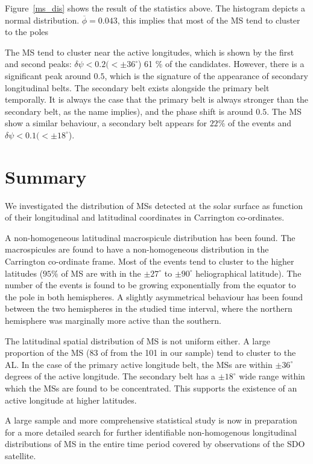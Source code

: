 Figure~\ref{ms_dis} shows the result of the statistics above. 
The histogram depicts a normal distribution. 
$\overline{\phi}=0.043$, this implies that most of the MS tend to cluster to the poles

The MS tend to cluster near the active longitudes, which is shown by the first and second peaks: $\delta\psi< 0.2 (<\pm 36^{\circ}$) 61 \% of the candidates.
However, there is a significant peak around $0.5$, which is the signature of the appearance of secondary longitudinal belts. 
The secondary belt exists alongside the primary belt temporally. 
It is always the case that the primary belt is always stronger than the secondary belt, as the name implies), and the phase shift is around $0.5$.
The MS show a similar behaviour, a secondary belt appears for $22\%$ of the events and $\delta\psi< 0.1 (<\pm 18^{\circ}$).

\section{Summary}
We investigated the distribution of MSs detected at the solar surface as function of their longitudinal and latitudinal coordinates in Carrington co-ordinates.

A non-homogeneous latitudinal macrospicule distribution has been found. 
The macrospicules are found to have a non-homogeneous distribution in the Carrington co-ordinate frame.  
Most of the events tend to cluster to the higher latitudes ($95\%$ of MS are with in the $\pm27^{\circ}$ to $\pm90^{\circ}$ heliographical latitude).
The number of the events is found to be growing exponentially from the equator to the pole in both hemispheres. 
A slightly asymmetrical behaviour has been found between the two hemispheres in the studied time interval, where the northern hemisphere was marginally more active than the southern. 

The latitudinal spatial distribution of MS is not uniform either. A large proportion of the MS (83 of from the 101 in our sample) tend to cluster to the AL.
In the case of the primary active longitude belt, the MSs are within $\pm 36^{\circ}$ degrees of the active longitude.
The secondary belt has a $\pm 18^{\circ}$ wide range within which the MSs are found to be concentrated.
This supports the existence of an active longitude at higher latitudes.

A large sample and more comprehensive statistical study is now in preparation for a more detailed search for further identifiable non-homogenous longitudinal distributions of MS in the entire time period covered by observations of the SDO satellite.
